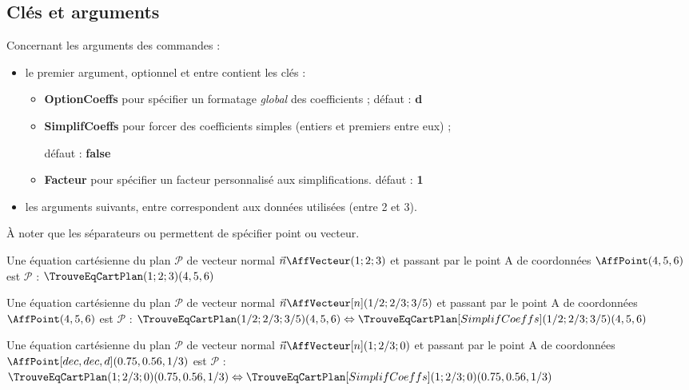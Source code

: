 \documentclass[a4paper,french,11pt]{article}
\newcommand\ctex[1]{\tcbox[vignettelatex]{#1}}
\newcommand\Cle[1]{{\bfseries\sffamily\textlangle \textcolor{orange!75!black}{#1}\textrangle}}
\begin{document}
\subsection{Clés et arguments}

\begin{cautionblock}
Concernant les arguments des commandes :

\begin{itemize}
	\item le premier argument, optionnel et entre \ctex{[...]}  contient les clés :
	\begin{itemize}
		\item \Cle{OptionCoeffs} pour spécifier un formatage \textit{global} des coefficients ; \hfill{}défaut : \Cle{d}
		\item \Cle{SimplifCoeffs} pour forcer des coefficients simples (entiers et premiers entre eux) ;
		
		\hfill{}défaut : \Cle{false}
		\item \Cle{Facteur} pour spécifier un facteur personnalisé aux simplifications. \hfill{}défaut : \Cle{1}
	\end{itemize}
	\item les arguments suivants, entre \ctex{(...)} correspondent aux données utilisées (entre 2 et 3).
\end{itemize}

À noter que les séparateurs \ctex{,} ou \ctex{;} permettent de spécifier point ou vecteur.
\end{cautionblock}

\begin{PresCodePL}{}
Une équation cartésienne du plan $\mathcal{P}$ de vecteur normal $\vec{n} \AffVecteur(1;2;3)$ et passant par le point A de coordonnées $\AffPoint(4,5,6)$ est $\mathcal{P}$ : $\TrouveEqCartPlan(1;2;3)(4,5,6)$
\end{PresCodePL}

\begin{PresCodePL}{}
Une équation cartésienne du plan $\mathcal{P}$ de vecteur normal $\vec{n} \AffVecteur[n](1/2;2/3;3/5)$ et passant par le point A de coordonnées $\AffPoint(4,5,6)$ est $\mathcal{P}$ : $\TrouveEqCartPlan(1/2;2/3;3/5)(4,5,6) \Leftrightarrow \TrouveEqCartPlan[SimplifCoeffs](1/2;2/3;3/5)(4,5,6)$
\end{PresCodePL}

\begin{PresCodePL}{}
Une équation cartésienne du plan $\mathcal{P}$ de vecteur normal $\vec{n} \AffVecteur[n](1;2/3;0)$ et passant par le point A de coordonnées $\AffPoint[dec,dec,d](0.75,0.56,1/3)$ est $\mathcal{P}$ :  $\TrouveEqCartPlan(1;2/3;0)(0.75,0.56,1/3) \Leftrightarrow  \TrouveEqCartPlan[SimplifCoeffs](1;2/3;0)(0.75,0.56,1/3)$
\end{PresCodePL}
\end{document}
